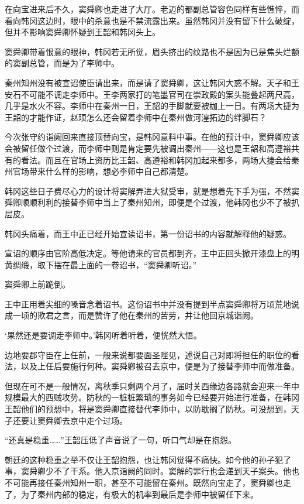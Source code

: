 在向宝进来后不久，窦舜卿也走进了大厅。老迈的都副总管容色同样有些憔悴，而看向韩冈这边时，眼中的杀意也是不禁流露出来。虽然韩冈并没有留下什么破绽，但并不影响窦舜卿怀疑到王韶和韩冈头上。

窦舜卿带着恨意的眼神，韩冈若无所觉，眉头挤出的纹路也不是因为已是焦头烂额的窦副总管，而是为了李师中。

秦州知州没有被宣诏使臣请出来，而是请了窦舜卿，这让韩冈大惑不解。天子和王安石不可能不调走李师中。王李两家打的笔墨官司在崇政殿的案头能叠起两尺高，几乎是水火不容。李师中在秦州一日，王韶的手脚就要被枷上一日。有两场大捷为王韶的才能作证，赵顼怎么还会留着李师中在秦州做河湟拓边的绊脚石？

今次张守约诣阙回来直接顶替向宝，是韩冈意料中事。在他的预计中，窦舜卿应该会被留任做个过渡，而李师中则是肯定要先被调出秦州——这也是王韶和高遵裕共有的看法。而且在官场上资历比王韶、高遵裕和韩冈加起来都多，两场大捷会给秦州官场带来什么样的影响，想必李师中自己都清楚。

韩冈这些日子费尽心力的设计将窦解弄进大狱受审，就是想着先下手为强，不然窦舜卿顺顺利利的接替李师中当上了秦州知州，即便是个过渡，他韩冈也少不了被扒层皮。

韩冈头痛着，而王中正已经开始宣读诏书，第一份诏书的内容就解释他的疑惑。

宣诏的顺序由官阶高低决定。等他请来的官员都到齐，王中正回头掀开漆盘上的明黄绸缎，取下摆在最上面的一卷诏书，“窦舜卿听诏。”

窦舜卿上前跪倒。

王中正用着尖细的嗓音念着诏书。这份诏书中并没有提到半点窦舜卿将万顷荒地说成一顷的欺君之言，而是赞许了他在秦州的苦劳，并让他回京城诣阙。

‘果然还是要调走李师中。’韩冈听着听着，便恍然大悟。

边地要郡守臣在上任前，一般来说都要面圣陛见，述说自己对即将担任的职位的看法，以及上任后要施行何种。窦舜卿被召去京中，便是为了接替李师中而做准备。

但现在可不是一般情况，离秋季只剩两个月了，届时关西缘边各路就会迎来一年中规模最大的西贼攻势。防秋的一桩桩繁琐的事务如今已经要开始进行准备，在韩冈王韶他们的预想中，将是窦舜卿直接替代李师中，以防耽搁了防秋。可没想到，天子还要让窦舜卿去京中走个过场。

“还真是稳重……”王韶压低了声音说了一句，听口气却是在抱怨。

朝廷的这种稳重之举不仅让王韶抱怨，也让韩冈觉得不痛快。如今他的孙子犯了事，窦舜卿少不了干系。他入京诣阙的同时。窦解的罪行也会递到天子案头。他也不可能再接任秦州知州一职，甚至不可能留在秦州。既然向宝走了，窦舜卿也走了，为了秦州内部的稳定，有极大的机率到最后是李师中被留任下来。

